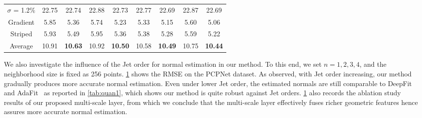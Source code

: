 \documentclass[runningheads]{llncs}
\begin{document}
\begin{table}[t]
\begin{center}
{\begin{tabular}{@{}ccccccccc@{}}
$\sigma$ = 1.2\%   & 22.75                   & 22.74                   & 22.88                   & 22.73                   & 22.77                   & 22.69                   & 22.87                   & 22.69                   \\
Gradient & 5.85                    & 5.36                    & 5.74                    & 5.23                    & 5.33                    & 5.15                    & 5.60                    & 5.06                    \\
Striped    & 5.93                    & 5.49                    & 5.95                    & 5.36                    & 5.38                    & 5.28                    & 5.59                    & 5.22                    \\
Average                   & 10.91                   & \textbf{10.63}                   & 10.92                   & \textbf{10.50}                   & 10.58                   & \textbf{10.49}                   & 10.75                   &\textbf{ 10.44}                   \\ \bottomrule
\end{tabular}}
\label{tab:njet}
\end{center}
\end{table}
 We also investigate the influence of the Jet order for normal estimation in our method. To this end, we set $n=1, 2, 3, 4$, and the neighborhood size is fixed as 256 points. \cref{tab:njet} shows the RMSE on the PCPNet dataset. As observed, with Jet order increasing, our method gradually produces more accurate normal estimation. Even under lower Jet order, the estimated normals are still comparable to DeepFit~\cite{ben2020deepfit} and AdaFit~\cite{zhu2021adafit} as reported in \cref{tab:quan1}, which shows our method is quite robust against Jet orders. \cref{tab:njet} also records the ablation study results of our proposed multi-scale layer, from which we conclude that the multi-scale layer effectively fuses richer geometric features hence assures more accurate normal estimation.
\end{document}
